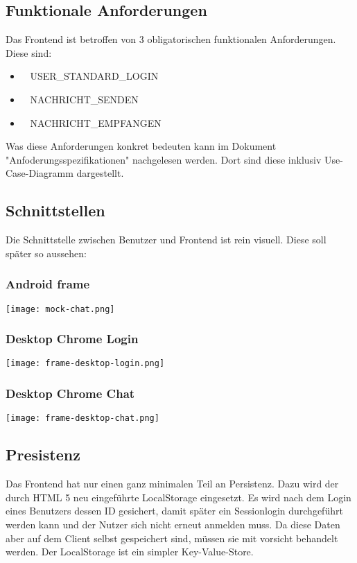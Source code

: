 	\subsection{Funktionale Anforderungen}
	Das Frontend ist betroffen von 3 obligatorischen funktionalen Anforderungen. Diese sind:
	\begin{itemize}
		\item \faLock~ USER\_STANDARD\_LOGIN
		\item \faSend~ NACHRICHT\_SENDEN
		\item \faEnvelope~ NACHRICHT\_EMPFANGEN
	\end{itemize}
	Was diese Anforderungen konkret bedeuten kann im Dokument "Anfoderungsspezifikationen" nachgelesen werden. Dort sind diese inklusiv Use-Case-Diagramm dargestellt.

	\subsection{Schnittstellen}
	Die Schnittstelle zwischen Benutzer und Frontend ist rein visuell. Diese soll später so aussehen:

	\subsubsection{Android frame}
	\texttt{[image: mock-chat.png]}
	\subsubsection{Desktop Chrome Login}
	\texttt{[image: frame-desktop-login.png]}
	\subsubsection{Desktop Chrome Chat}
	\texttt{[image: frame-desktop-chat.png]}

	\subsection{Presistenz}
	Das Frontend hat nur einen ganz minimalen Teil an Persistenz. Dazu wird der durch HTML 5 neu eingeführte LocalStorage eingesetzt. Es wird nach dem Login eines Benutzers dessen ID gesichert, damit später ein Sessionlogin durchgeführt werden kann und der Nutzer sich nicht erneut anmelden muss. Da diese Daten aber auf dem Client selbst gespeichert sind, müssen sie mit vorsicht behandelt werden. Der LocalStorage ist ein simpler Key-Value-Store.

